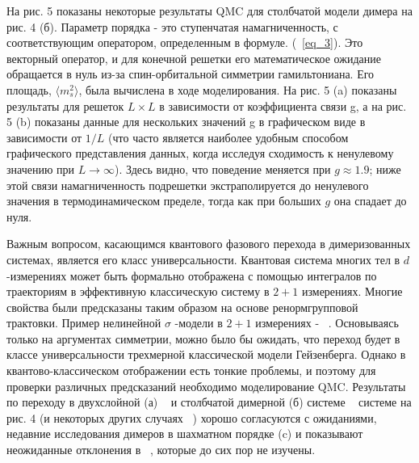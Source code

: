 \documentclass[11pt]{article}
\begin{document}
На рис. 5 показаны некоторые результаты QMC для столбчатой модели димера на рис. 4 (б). Параметр порядка - это ступенчатая намагниченность, с соответствующим оператором, определенным в формуле. (~\ref{eq_3}). Это векторный оператор, и для конечной решетки его математическое ожидание обращается в нуль из-за спин-орбитальной симметрии гамильтониана. Его площадь, $\langle m_s^2 \rangle$, была вычислена в ходе моделирования. На рис. 5 (a) показаны результаты для решеток $L × L$ в зависимости от коэффициента связи g, а на рис. 5 (b) показаны данные для нескольких значений g в графическом виде в зависимости от $1 / L$ (что часто является наиболее удобным способом графического представления данных, когда исследуя сходимость к ненулевому значению при $L \to \infty$). Здесь видно, что поведение меняется при $g \approx 1.9$; ниже этой связи намагниченность подрешетки экстраполируется до ненулевого значения в термодинамическом пределе, тогда как при больших $g$ она спадает до нуля.

Важным вопросом, касающимся квантового фазового перехода в димеризованных системах, является его класс универсальности. Квантовая система многих тел в $d$-измерениях может быть формально отображена с помощью интегралов по траекториям в эффективную классическую систему в $2 + 1$ измерениях. Многие свойства были предсказаны таким образом на основе ренормгрупповой трактовки. Пример нелинейной $\sigma$ -модели в $2 + 1$ измерениях - ~\cite{prb_39_2344, prb_49_11919}. Основываясь только на аргументах симметрии, можно было бы ожидать, что переход будет в классе универсальности трехмерной классической модели Гейзенберга. Однако в квантово-классическом отображении есть тонкие проблемы, и поэтому для проверки различных предсказаний необходимо моделирование QMC. Результаты по переходу в двухслойной (а) ~\cite{prb_73_014431} и столбчатой ​​димерной (б) системе ~\cite{prb_65_014407}  системе на рис. 4 (и некоторых других случаях ~\cite{prl_76_3822, prb_79_014410}) хорошо согласуются с ожиданиями, недавние исследования димеров в шахматном порядке (c) и показывают неожиданные отклонения в ~\cite{prl_101_127202}, которые до сих пор не изучены.
\end{document}
